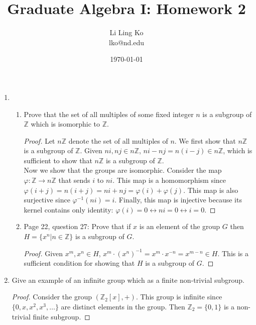 \documentclass{article}
\begin{document}
\title{Graduate Algebra I: Homework 2}
\author{Li Ling Ko\\ lko@nd.edu}
\date{\today}
\maketitle

\begin{enumerate}
  \item
    \begin{enumerate}
      \item Prove that the set of all multiples of some fixed integer $n$
        is a subgroup of $\mathbb{Z}$ which is isomorphic to $\mathbb{Z}$.
        \begin{proof}
          Let $n\mathbb{Z}$ denote the set of all multiples of $n$. We
          first show that $n\mathbb{Z}$ is a subgroup of $\mathbb{Z}$.
          Given $ni,nj\in n\mathbb{Z}$, $ni-nj=n(i-j)\in n\mathbb{Z}$,
          which is sufficient to show that $n\mathbb{Z}$ is a subgroup of
          $\mathbb{Z}$. \\
          
          Now we show that the groups are isomorphic. Consider the map
          $\varphi:\mathbb{Z}\rightarrow n\mathbb{Z}$ that sends $i$ to
          $ni$. This map is a homomorphism since
          $\varphi(i+j)=n(i+j)=ni+nj=\varphi(i)+\varphi(j)$. This map is
          also surjective since $\varphi^{-1}(ni)=i$. Finally, this map is
          injective because its kernel contains only identity:
          $\varphi(i)=0\leftrightarrow ni=0\leftrightarrow i=0$.
        \end{proof}
      \item Page 22, question 27: Prove that if $x$ is an element of the
        group $G$ then $H=\{x^n|n\in\mathbb{Z}\}$ is a subgroup of $G$.

        \begin{proof}
          Given $x^m,x^n\in H$, $x^m\cdot(x^n)^{-1}=x^m\cdot
          x^{-n}=x^{m-n}\in H$. This is a sufficient condition for showing
          that $H$ is a subgroup of $G$.
        \end{proof}
    \end{enumerate}

  \item Give an example of an infinite group which as a finite non-trivial
    subgroup.

    \begin{proof}
      Consider the group $(\mathbb{Z}_2[x],+)$. This group is infinite
      since $\{0,x,x^2,x^3,\ldots\}$ are distinct elements in the group.
      Then $\mathbb{Z}_2=\{0,1\}$ is a non-trivial finite subgroup.
    \end{proof}


\end{enumerate}
\end{document}
